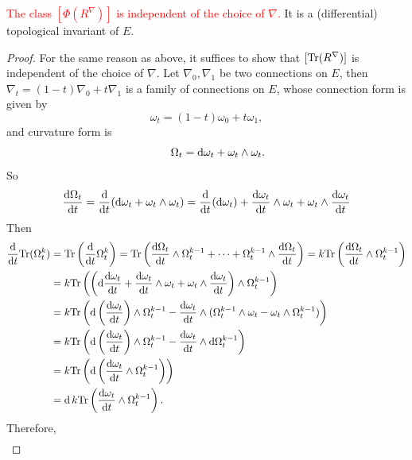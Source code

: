 \begin{proposition}\label{prop:independent}
    \textcolor{red}{The class $[\Phi(R^\nabla)]$ is independent of the choice of $\nabla$.}
    It is a {\rm(}differential{\rm)} topological invariant of $E$.
\end{proposition}
\begin{proof}
    For the same reason as above, it suffices to show that $[{\rm Tr}(R^\nabla)]$ is independent of the choice of $\nabla$. 
    Let $\nabla_0, \nabla_1$ be two connections on $E$, then $\nabla_t = (1-t)\nabla_0 + t\nabla_1$ is a family of connections on $E$, 
    whose connection form is given by 
    \begin{equation*}
        \omega_t = (1-t)\omega_0 + t\omega_1,
    \end{equation*}
    and curvature form is 
    \begin{equation*}
        \qquad \Omega_t = {\rm d}\omega_t + \omega_t\wedge\omega_t.
    \end{equation*}
    So 
    \begin{equation*}
        \frac{\mathrm{d} \Omega_t}{\mathrm{d} t} = \frac{\mathrm{d} }{\mathrm{d} t}({\rm d}\omega_t + \omega_t\wedge\omega_t)
        = \frac{\mathrm{d} }{\mathrm{d} t}({\rm d}\omega_t) 
        + \frac{\mathrm{d} \omega_t}{\mathrm{d} t}\wedge\omega_t 
        + \omega_t\wedge\frac{\mathrm{d} \omega_t}{\mathrm{d} t} 
    \end{equation*}
    Then 
    \begin{align*}
        \frac{\mathrm{d} }{\mathrm{d} t}{\rm Tr}(\Omega_t^k) 
        &= {\rm Tr}\left(\frac{\mathrm{d} }{\mathrm{d} t}\Omega_t^k\right) 
        = {\rm Tr}\left(\frac{\mathrm{d} \Omega_t}{\mathrm{d} t}\wedge\Omega_t^{k-1} + \cdots + \Omega_t^{k-1}\wedge\frac{\mathrm{d} \Omega_t}{\mathrm{d} t}\right) 
        = k{\rm Tr}\left(\frac{\mathrm{d} \Omega_t}{\mathrm{d} t}\wedge\Omega_t^{k-1}\right) \\
        &= k{\rm Tr}\left(\left({\rm d}\frac{\mathrm{d} \omega_t}{\mathrm{d} t} + \frac{\mathrm{d} \omega_t}{\mathrm{d} t}\wedge\omega_t + \omega_t\wedge\frac{\mathrm{d} \omega_t}{\mathrm{d} t}\right)
        \wedge\Omega_t^{k-1}\right) \\ 
        &= k{\rm Tr}\left({\rm d}\left(\frac{\mathrm{d} \omega_t}{\mathrm{d} t}\right)\wedge\Omega_t^{k-1} 
        - \frac{\mathrm{d} \omega_t}{\mathrm{d} t}\wedge(\Omega_t^{k-1}\wedge\omega_t - \omega_t\wedge\Omega_t^{k-1})\right) \\ 
        &= k{\rm Tr}\left({\rm d}\left(\frac{\mathrm{d} \omega_t}{\mathrm{d} t}\right)\wedge\Omega_t^{k-1} - \frac{\mathrm{d} \omega_t}{\mathrm{d} t}\wedge{\rm d}\Omega_t^{k-1}\right) \\ 
        &= k{\rm Tr}\left({\rm d}\left(\frac{\mathrm{d} \omega_t}{\mathrm{d} t}\wedge\Omega_t^{k-1}\right)\right) \\ 
        &= {\rm d}\, k{\rm Tr}\left(\frac{\mathrm{d} \omega_t}{\mathrm{d} t}\wedge\Omega_t^{k-1}\right).
    \end{align*}
    Therefore, 
    \begin{align}\label{eq:transgression}

\end{align}
\end{proof}
